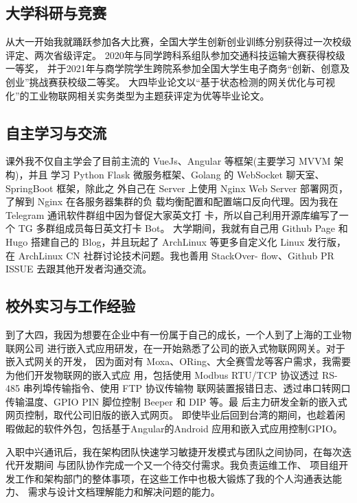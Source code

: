 \documentclass{article}
\begin{document}
\begin{bibunit}[plain]
\subsection{大学科研与竞赛}
从大一开始我就踊跃参加各大比赛，全国大学生创新创业训练分别获得过一次校级评定、两次省级评定。
2020年与同学跨科系组队参加交通科技运输大赛获得校级一等奖，
并于2021年与商学院学生跨院系参加全国大学生电子商务“创新、创意及创业”挑战赛获校级二等奖。
大四毕业论文以“基于状态检测的网关优化与可视化”的工业物联网相关实务类型为主题获评定为优等毕业论文。

\subsection{自主学习与交流}
课外我不仅自主学会了目前主流的 VueJs、Angular 等框架(主要学习 MVVM 架构)，并且
学习 Python Flask 微服务框架、Golang 的 WebSocket 聊天室、SpringBoot 框架，除此之
外自己在 Server 上使用 Nginx Web Server 部署网页，了解到 Nginx 在各服务器集群的负
载均衡配置和配置端口反向代理。因为我在 Telegram 通讯软件群组中因为督促大家英文打
卡，所以自己利用开源库编写了一个 TG 多群组成员每日英文打卡 Bot。
大学期间，我就有自己用 Github Page 和 Hugo 搭建自己的 Blog，并且玩起了 ArchLinux
等更多自定义化 Linux 发行版，在 ArchLinux CN 社群讨论技术问题。我也善用 StackOver-
flow、Github PR ISSUE 去跟其他开发者沟通交流。

\subsection{校外实习与工作经验}
到了大四，我因为想要在企业中有一份属于自己的成长，一个人到了上海的工业物联网公司
进行嵌入式应用研发，在一开始熟悉了公司的嵌入式物联网网关。对于嵌入式网关的开发，
因为面对有 Moxa、ORing、大全赛雪龙等客户需求，我需要为他们开发物联网的嵌入式应
用，包括使用 Modbus RTU/TCP 协议透过 RS-485 串列埠传输指令、使用 FTP 协议传输物
联网装置报错日志、透过串口转网口传输温度、GPIO PIN 脚位控制 Beeper 和 DIP 等。最
后主力研发全新的嵌入式网页控制，取代公司旧版的嵌入式网页。
即使毕业后回到台湾的期间，也趁着闲暇做起的软件外包，包括基于Angular的Android
应用和嵌入式应用控制GPIO。

入职中兴通讯后，我在架构团队快速学习敏捷开发模式与团队之间协同，在每次迭代开发期间
与团队协作完成一个又一个待交付需求。我负责运维工作、
项目组开发工作和架构部门的整体事项，在这些工作中也极大锻炼了我的个人沟通表达能力、
需求与设计文档理解能力和解决问题的能力。

\end{bibunit}
\end{document}
